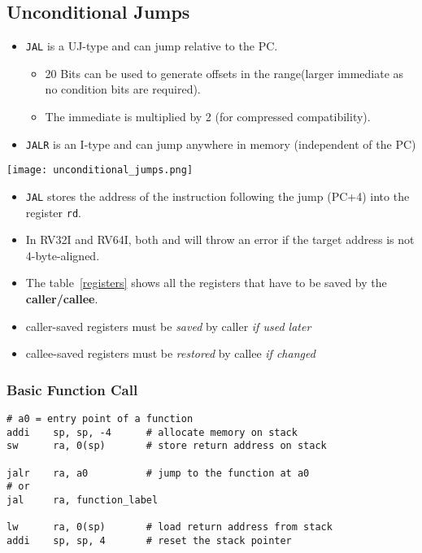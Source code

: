 \subsection{Unconditional Jumps}

\begin{itemize}
    \item \texttt{JAL} is a UJ-type and can jump relative to the PC.\
          \begin{itemize}
              \item 20 Bits can be used to generate offsets in the range\newline [-1 MB, 1 MB] (larger immediate as no condition bits are required).
              \item The immediate is multiplied by 2 (for compressed compatibility).
          \end{itemize}
    \item \texttt{JALR} is an I-type and can jump anywhere in memory (independent of the PC)
\end{itemize}

\texttt{[image: unconditional\_jumps.png]}
\begin{itemize}
    \item \texttt{JAL} stores the address of the instruction following the jump (PC+4) into the register \texttt{rd}.
    \item In RV32I and RV64I, both \code{JAL} and \code{JALR} will throw an error if the target address is not 4-byte-aligned.
    \item The table~\ref{registers} shows all the registers that have to be saved by the \textbf{caller/callee}.
    \item caller-saved registers must be \textit{saved} by caller \textit{if used later}
    \item callee-saved registers must be \textit{restored} by callee \textit{if changed}
\end{itemize}


\subsubsection{Basic Function Call}

\begin{lstlisting}[language={[RISC-V]Assembler}]
# a0 = entry point of a function 
addi    sp, sp, -4      # allocate memory on stack
sw      ra, 0(sp)       # store return address on stack

jalr    ra, a0          # jump to the function at a0
# or
jal     ra, function_label

lw      ra, 0(sp)       # load return address from stack 
addi    sp, sp, 4       # reset the stack pointer
\end{lstlisting}

